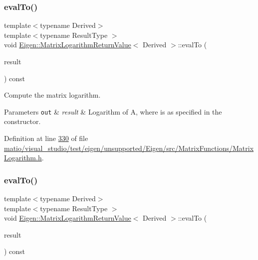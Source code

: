 \subsubsection{\texorpdfstring{eval\+To()}{evalTo()}\hspace{0.1cm}{\footnotesize\ttfamily [1/2]}}
{\footnotesize\ttfamily template$<$typename Derived$>$ \\
template$<$typename Result\+Type $>$ \\
void \hyperlink{class_eigen_1_1_matrix_logarithm_return_value}{Eigen\+::\+Matrix\+Logarithm\+Return\+Value}$<$ Derived $>$\+::eval\+To (\begin{DoxyParamCaption}\item[{Result\+Type \&}]{result }\end{DoxyParamCaption}) const\hspace{0.3cm}{\ttfamily [inline]}}



Compute the matrix logarithm. 


\begin{DoxyParams}[1]{Parameters}
\mbox{\tt out}  & {\em result} & Logarithm of {\ttfamily A}, where  is as specified in the constructor. \\
\hline
\end{DoxyParams}


Definition at line \hyperlink{matio_2visual__studio_2test_2eigen_2unsupported_2_eigen_2src_2_matrix_functions_2_matrix_logarithm_8h_source_l00330}{330} of file \hyperlink{matio_2visual__studio_2test_2eigen_2unsupported_2_eigen_2src_2_matrix_functions_2_matrix_logarithm_8h_source}{matio/visual\+\_\+studio/test/eigen/unsupported/\+Eigen/src/\+Matrix\+Functions/\+Matrix\+Logarithm.\+h}.

\mbox{\label{class_eigen_1_1_matrix_logarithm_return_value_ac17537a51ce53a44746fabd7a83d29d3}} 
\subsubsection{\texorpdfstring{eval\+To()}{evalTo()}\hspace{0.1cm}{\footnotesize\ttfamily [2/2]}}
{\footnotesize\ttfamily template$<$typename Derived$>$ \\
template$<$typename Result\+Type $>$ \\
void \hyperlink{class_eigen_1_1_matrix_logarithm_return_value}{Eigen\+::\+Matrix\+Logarithm\+Return\+Value}$<$ Derived $>$\+::eval\+To (\begin{DoxyParamCaption}\item[{Result\+Type \&}]{result }\end{DoxyParamCaption}) const\hspace{0.3cm}{\ttfamily [inline]}}



